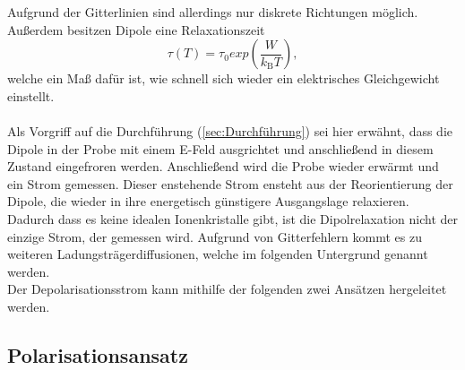 Aufgrund der Gitterlinien sind allerdings nur diskrete Richtungen möglich.
Außerdem besitzen Dipole eine Relaxationszeit
\begin{equation}
    \tau(T) = \tau_0 exp(\frac{W}{k_\text{B} T}),
    \label{eqn:Relaxationszeit}
\end{equation}
welche ein Maß dafür ist, wie schnell sich wieder ein elektrisches Gleichgewicht einstellt.\\
\\ 
Als Vorgriff auf die Durchführung (\ref{sec:Durchführung}) sei hier erwähnt, dass die Dipole in der Probe
mit einem E-Feld ausgrichtet und anschließend in diesem Zustand eingefroren werden. Anschließend
wird die Probe wieder erwärmt und ein Strom gemessen. Dieser enstehende Strom ensteht aus der Reorientierung
der Dipole, die wieder in ihre energetisch günstigere Ausgangslage relaxieren. Dadurch dass es keine idealen Ionenkristalle
gibt, ist die Dipolrelaxation nicht der einzige Strom, der gemessen wird. Aufgrund von Gitterfehlern kommt es zu weiteren
Ladungsträgerdiffusionen, welche im folgenden Untergrund genannt werden. \\
Der Depolarisationsstrom kann mithilfe der folgenden zwei Ansätzen hergeleitet werden.


\subsection{Polarisationsansatz}
\label{subsec:Polarisation}

